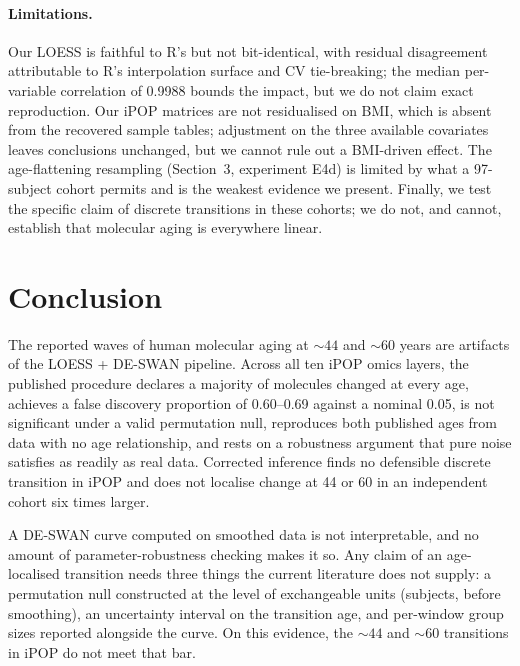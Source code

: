 \documentclass{article}
\begin{document}
\paragraph{Limitations.} Our LOESS is faithful to R's but not bit-identical, with residual disagreement attributable to R's interpolation surface and CV tie-breaking; the median per-variable correlation of 0.9988 bounds the impact, but we do not claim exact reproduction. Our iPOP matrices are not residualised on BMI, which is absent from the recovered sample tables; adjustment on the three available covariates leaves conclusions unchanged, but we cannot rule out a BMI-driven effect. The age-flattening resampling (Section~3, experiment E4d) is limited by what a 97-subject cohort permits and is the weakest evidence we present. Finally, we test the specific claim of discrete transitions in these cohorts; we do not, and cannot, establish that molecular aging is everywhere linear.

\section{Conclusion}

The reported waves of human molecular aging at ${\sim}44$ and ${\sim}60$ years are artifacts of the LOESS + DE-SWAN pipeline. Across all ten iPOP omics layers, the published procedure declares a majority of molecules changed at every age, achieves a false discovery proportion of 0.60--0.69 against a nominal 0.05, is not significant under a valid permutation null, reproduces both published ages from data with no age relationship, and rests on a robustness argument that pure noise satisfies as readily as real data. Corrected inference finds no defensible discrete transition in iPOP and does not localise change at 44 or 60 in an independent cohort six times larger.

A DE-SWAN curve computed on smoothed data is not interpretable, and no amount of parameter-robustness checking makes it so. Any claim of an age-localised transition needs three things the current literature does not supply: a permutation null constructed at the level of exchangeable units (subjects, before smoothing), an uncertainty interval on the transition age, and per-window group sizes reported alongside the curve. On this evidence, the ${\sim}44$ and ${\sim}60$ transitions in iPOP do not meet that bar.
\end{document}
